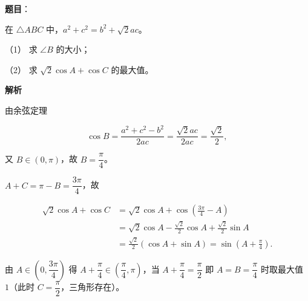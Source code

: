 \begin{answer}

\textbf{题目}：

在 \(\triangle ABC\) 中，\(a^{2}+c^{2}=b^{2}+\sqrt{2}ac\)。

（1） 求 \(\angle B\) 的大小；

（2） 求 \(\sqrt{2}\cos A+\cos C\) 的最大值。

\textbf{解析}


由余弦定理

\nopagebreak[4]
\[
\cos B=\frac{a^2+c^2-b^2}{2ac}=\frac{\sqrt2ac}{2ac}=\frac{\sqrt2}{2},
\]

又 \(B\in(0,\pi)\)，故 \(B=\dfrac{\pi}{4}\)。


\(A+C=\pi-B=\dfrac{3\pi}{4}\)，故

\nopagebreak[4]
\[
\begin{aligned}
\sqrt2\cos A+\cos C&=\sqrt2\cos A+\cos\left(\frac{3\pi}{4}-A\right)\\
&=\sqrt2\cos A-\frac{\sqrt2}{2}\cos A+\frac{\sqrt2}{2}\sin A\\
&=\frac{\sqrt2}{2}(\cos A+\sin A)=\sin\left(A+\frac{\pi}{4}\right).
\end{aligned}
\]

由 \(A\in\left(0,\dfrac{3\pi}{4}\right)\) 得 \(A+\dfrac{\pi}{4}\in\left(\dfrac{\pi}{4},\pi\right)\)，当 \(A+\dfrac{\pi}{4}=\dfrac{\pi}{2}\) 即 \(A=B=\dfrac{\pi}{4}\) 时取最大值 \(1\)（此时 \(C=\dfrac{\pi}{2}\)，三角形存在）。



\end{answer}
